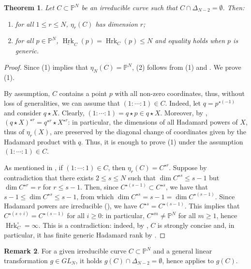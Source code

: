 \documentclass{amsart}
\theoremstyle{plain}
\newtheorem{theorem}{Theorem}
\numberwithin{theorem}{section}
\theoremstyle{definition}
\newtheorem{remark}[theorem]{Remark}
\newcommand{\bbP}{\mathbb{P}}
\newcommand{\Hrk}{\operatorname{Hrk}}
\begin{document}
\begin{theorem}
\label{thm:curves_finite}
    Let $C \subset \bbP^N$ be an irreducible curve such that $C \cap \Delta_{N-2} = \emptyset$. Then:
    \begin{enumerate}
        \item for all $1 \leq r \leq N$, $\eta_r(C)$ has dimension $r$;
        \item for all $p \in \bbP^N$, $\underline{\Hrk}_C(p) = \Hrk_C(p) \leq N$ and equality holds when $p$ is generic.
    \end{enumerate}
\end{theorem}
\begin{proof}
    Since (1) implies that $\eta_N(C) = \bbP^N$, (2) follows from (1) and . We prove (1).

    By assumption, $C$ contains a point $p$ with all non-zero coordinates, thus, without loss of generalities, we can assume that $(1:\cdots:1) \in C$. Indeed, let $q = p^{\star (-1)}$ and consider $q \star X$. Clearly, $(1:\cdots:1) = q \star p \in q \star X$. Moreover, by \cite[Lemma~3.13]{hadamardranks}, $(q \star X)^{\star r} = q^{\star r} \star X^{\star r}$: in particular, the dimensions of all Hadamard powers of $X$, thus of $\eta_r(X)$, are preserved by the diagonal change of coordinates given by the Hadamard product with $q$. Thus, it is enough to prove (1) under the assumption $(1:\cdots:1) \in C$. 
    
    As mentioned in , if $(1:\cdots:1) \in C$, then $\eta_r(C) = C^{\star r}$. Suppose by contradiction that there exists $2 \leq s \leq N$ such that $\dim C^{\star s} \leq s-1$ but $\dim C^{\star r} = r$ for $r \leq s-1$. Then, since $C^{\star (s-1)} \subset C^{\star s}$, we have that $s-1 \leq \dim C^{\star s} \leq s-1$, from which $\dim C^{\star s} = s-1 = \dim C^{\star (s-1)}$. Since Hadamard powers are irreducible (), we have $C^{\star s} = C^{\star (s-1)}$. This implies that $C^{\star (s+i)} = C^{\star (s-1)}$ for all $i \geq 0$: in particular, $C^{\star m} \neq \bbP^N$ for all $m\geq 1$, hence $\Hrk_C^\circ = \infty$. This is a contradiction: indeed, by , $C$ is strongly concise and, in particular, it has finite generic Hadamard rank by .
\end{proof}

\begin{remark}
    For a given irreducible curve $C \subset \bbP^N$ and a general linear transformation $g \in GL_N$, it holds $g(C) \cap \Delta_{N-2} = \emptyset$, hence  applies to $g(C)$. 
\end{remark}
\end{document}
